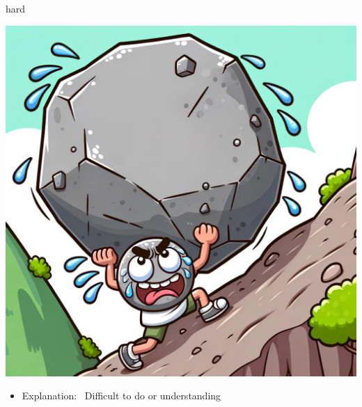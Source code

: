 \documentclass[avery5371, grid,frame]{flashcards}
\begin{document}
\renewcommand{\cardpaper}{a4paper}
\renewcommand{\cardpapermode}{landscape}
\renewcommand{\cardrows}{2}
\renewcommand{\cardcolumns}{2}
\setlength{\cardheight}{3.5in}
\setlength{\cardwidth}{5.0in}
\setlength{\topoffset}{0.50in}
\setlength{\oddoffset}{0.50in}
\setlength{\evenoffset}{0.50in}

\begin{flashcard}{hard}
    \vspace*{\fill}
    \begin{center}
        \begin{minipage}[c]{.45\textwidth}
            \includegraphics[width=\textwidth]{cards/h/hard/hard - a character struggling to push a massive boulder up a steep hill, beads of sweat on their forehead.png}
        \end{minipage}
        \begin{minipage}[c]{.45\textwidth}
            \begin{itemize}\setlength\itemsep{12pt}
            \item Explanation: \ Difficult to do or understanding


\end{itemize}
\end{minipage}
\end{center}
\end{flashcard}
\end{document}
